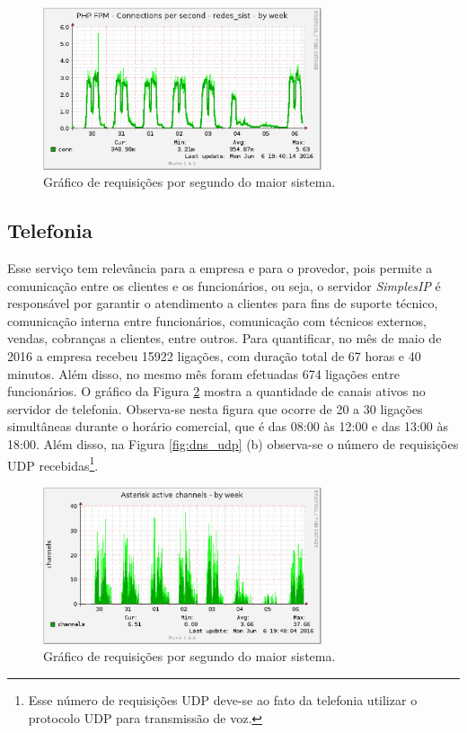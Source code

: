 
\begin{figure}[h!]
 \centering
 \includegraphics[width=310px]{img/soldi_week.eps}
 \caption{Gráfico de requisições por segundo do maior sistema.}
 \label{fig:soldi_week}
\end{figure}

\subsection{Telefonia}
\label{section:telefonia}

Esse serviço tem relevância para a empresa e para o provedor, pois permite a comunicação entre os clientes e os funcionários, ou seja, o 
servidor \textit{SimplesIP} é responsável por garantir o atendimento a clientes para fins de suporte técnico, comunicação interna entre 
funcionários, comunicação com técnicos externos, vendas, cobranças a clientes, entre outros. Para quantificar, no mês de maio de 2016 a empresa 
recebeu 15922 ligações, com duração total de 67 horas e 40 minutos. Além disso, no mesmo mês foram efetuadas 674 ligações entre funcionários. 
O gráfico da Figura \ref{fig:simplesip_week} mostra a quantidade de canais ativos no servidor de telefonia. Observa-se nesta figura que ocorre 
de 20 a 30 ligações simultâneas durante o horário comercial, que é das 08:00 às 12:00 e das 13:00 às 18:00. Além disso, na Figura 
\ref{fig:dns_udp} (b) observa-se o número de requisições \ac{UDP} recebidas\footnote[1]{Esse número de requisições \ac{UDP} deve-se ao fato
da telefonia utilizar o protocolo \ac{UDP} para transmissão de voz.}.

\begin{figure}[h!]
 \centering
 \includegraphics[width=310px]{img/simplesip_week.eps}
 \caption{Gráfico de requisições por segundo do maior sistema.}
 \label{fig:simplesip_week}
\end{figure}

